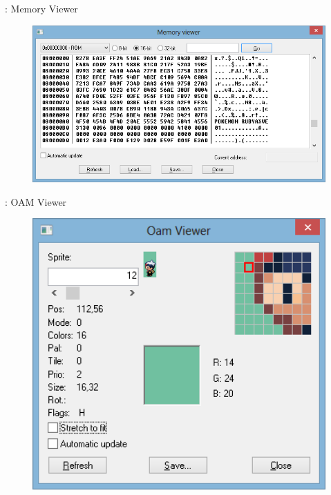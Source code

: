 \documentclass{beamer}
\begin{document}
\begin{darkframes}
\begin{frame}{\subsecname: Memory Viewer}
    \begin{figure}
        \centering
        \includegraphics[width=1\textwidth,height=0.5\textheight,keepaspectratio]{memview}
    \end{figure}
\end{frame}

\begin{frame}{\subsecname: OAM Viewer}
    \begin{figure}
        \centering
        \includegraphics[width=1\textwidth,height=0.5\textheight,keepaspectratio]{oamview}
    \end{figure}
\end{frame}


\end{darkframes}
\end{document}
